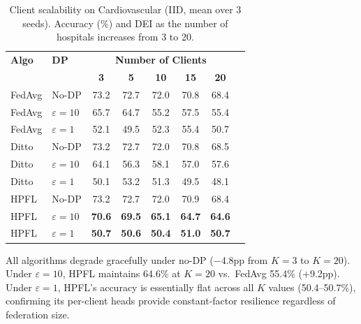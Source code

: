 \documentclass[conference,a4paper]{IEEEtran}
\begin{document}
\begin{table}[htbp]
\centering
\caption{Client scalability on Cardiovascular (IID, mean over 3 seeds). Accuracy (\%) and DEI as the number of hospitals increases from 3 to 20.}
\label{tab:scalability}
\small
\begin{tabular}{llcccccc}
\toprule
\textbf{Algo} & \textbf{DP} & \multicolumn{5}{c}{\textbf{Number of Clients}} \\
 & & \textbf{3} & \textbf{5} & \textbf{10} & \textbf{15} & \textbf{20} \\
\midrule
FedAvg & No-DP & 73.2 & 72.7 & 72.0 & 70.8 & 68.4 \\
FedAvg & $\varepsilon{=}10$ & 65.7 & 64.7 & 55.2 & 57.5 & 55.4 \\
FedAvg & $\varepsilon{=}1$ & 52.1 & 49.5 & 52.3 & 55.4 & 50.7 \\
\midrule
Ditto & No-DP & 73.2 & 72.7 & 72.0 & 70.8 & 68.5 \\
Ditto & $\varepsilon{=}10$ & 64.1 & 56.3 & 58.1 & 57.0 & 57.6 \\
Ditto & $\varepsilon{=}1$ & 50.1 & 53.2 & 51.3 & 49.5 & 48.1 \\
\midrule
HPFL & No-DP & 73.2 & 72.7 & 72.0 & 70.9 & 68.4 \\
HPFL & $\varepsilon{=}10$ & \textbf{70.6} & \textbf{69.5} & \textbf{65.1} & \textbf{64.7} & \textbf{64.6} \\
HPFL & $\varepsilon{=}1$ & \textbf{50.7} & \textbf{50.6} & \textbf{50.4} & \textbf{51.0} & \textbf{50.7} \\
\bottomrule
\end{tabular}

\vspace{1mm}
\footnotesize{All algorithms degrade gracefully under no-DP ($-$4.8pp from $K{=}3$ to $K{=}20$). Under $\varepsilon{=}10$, HPFL maintains 64.6\% at $K{=}20$ vs.\ FedAvg 55.4\% ($+$9.2pp). Under $\varepsilon{=}1$, HPFL's accuracy is essentially flat across all $K$ values (50.4--50.7\%), confirming its per-client heads provide constant-factor resilience regardless of federation size.}
\end{table}

\end{document}
